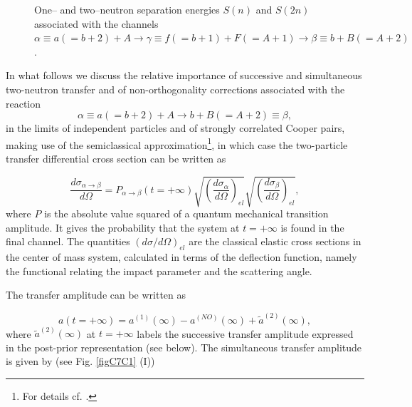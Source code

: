 \begin{subappendices}
\begin{figure}
\begin{center}
\end{center}
\caption{One-- and two--neutron separation energies $S(n)$ and $S(2n)$ associated with the channels $\alpha\equiv a(=b+2)+A \rightarrow \gamma \equiv f(=b+1)+F(=A+1)\rightarrow \beta \equiv b+B(=A+2)$.}\label{figC7C3}
\end{figure}
In what follows we discuss the relative importance of successive and simultaneous two-neutron transfer and of non-orthogonality 
corrections associated with the reaction 
\begin{equation}
\alpha \equiv  a(=b+2) + A \to b + B(=A+2) \equiv \beta,
\label{A1}
\end{equation}
in the limits of independent particles and of strongly correlated Cooper pairs, making use  of the semiclassical approximation\footnote{For details cf. \cite{Broglia:04a}.}, in which case the two-particle transfer differential cross section can be written as

\begin{equation}
\frac{d \sigma_{\alpha \to \beta} }{d \Omega} = P_{\alpha \to \beta} (t = +\infty) 
\sqrt{ \left( \frac{d \sigma_{\alpha}}{d \Omega} \right)_{el} }
\sqrt{ \left( \frac{d \sigma_{\beta}}{d \Omega} \right)_{el}}, 
\label{A2}
\end{equation}
where $P$ is the absolute value squared of a quantum mechanical transition amplitude. It gives the probability that the system at $t = + \infty$ is found in the final channel. The quantities $(d \sigma/d\Omega)_{el}$ are the classical elastic cross sections  in the center of mass system, calculated in terms of the deflection function, namely the functional relating the impact parameter and the scattering angle. 

The transfer amplitude can be written as  


\begin{equation}
a(t = + \infty) = a^{(1)}(\infty) - a^{(NO)}(\infty) + \tilde a^{(2)} ( \infty),
\label{A3}
\end{equation}
where $\tilde a^{(2)}(\infty)$ at $t= + \infty$ 
labels  the successive transfer amplitude expressed in the post-prior representation (see below).
The simultaneous transfer amplitude is given by (see Fig. \ref{figC7C1} (I))


\end{subappendices}
